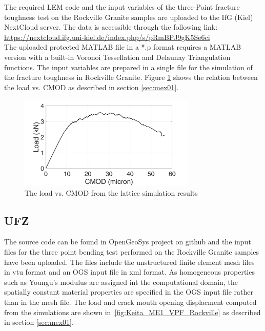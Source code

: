 The required LEM code and the input variables of the three-Point fracture toughness test on the Rockville Granite samples are uploaded to the IfG (Kiel) NextCloud server. The data is accessible through the following link:\\
\hyperlink{https://nextcloud.ifg.uni-kiel.de/index.php/s/pRmBPJ9gK5Se6ci}{https://nextcloud.ifg.uni-kiel.de/index.php/s/pRmBPJ9gK5Se6ci}\\

The uploaded protected MATLAB file in a *.p format requires a MATLAB version with a built-in Voronoi Tessellation and Delaunay Triangulation functions. The input variables are prepared in a single file for the simulation of the fracture toughness in Rockville Granite. Figure \ref{fig:Amir_ME1_LEM_Displacement_Crystalline_Data} shows the relation between the load vs. CMOD as described in section \ref {sec:mex01}.

\begin{figure}[!ht]
\centering
\includegraphics[width=0.75\textwidth]{figures/Amir_ME1_LEM_Displacement_Crystalline_Data.png}
\caption{The load vs. CMOD from the lattice simulation results}
\label{fig:Amir_ME1_LEM_Displacement_Crystalline_Data}
\end{figure}

\subsection*{UFZ}
The source code can be found in OpenGeoSys project on github and  the input files for the three point bending test performed on the Rockville Granite samples have been uploaded.
The files include the unstructured finite element mesh files in vtu format and an OGS input file in xml format.
As homogeneous properties such as Youngu's modulus are assigned int the computational domain, the spatially constant material properties are specified in the OGS input file rather than in the mesh file.
The load and crack mouth opening displacment computed from the simulations are shown in~\ref{fig:Keita_ME1_VPF_Rockville} as described in section \ref {sec:mex01}.

